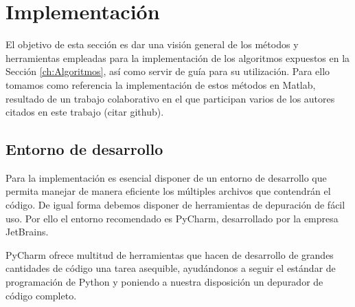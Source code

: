






\chapter{Implementación}\label{ch:Impl}

El objetivo de esta sección es dar una visión general de los métodos y herramientas empleadas para la implementación de los algoritmos expuestos en la Sección \ref{ch:Algoritmos}, así como servir de guía para su utilización. Para ello tomamos como referencia la implementación de estos métodos en Matlab, resultado de un trabajo colaborativo en el que participan varios de los autores citados en este trabajo (citar github).

\section{Entorno de desarrollo}

Para la implementación es esencial disponer de un entorno de desarrollo que permita manejar de manera eficiente los múltiples archivos que contendrán el código. De igual forma debemos disponer de herramientas de depuración de fácil uso. Por ello el entorno recomendado es PyCharm, desarrollado por la empresa JetBrains.

PyCharm ofrece multitud de herramientas que hacen de desarrollo de grandes cantidades de código una tarea asequible, ayudándonos a seguir el estándar de programación de Python y poniendo a nuestra disposición un depurador de código completo.

